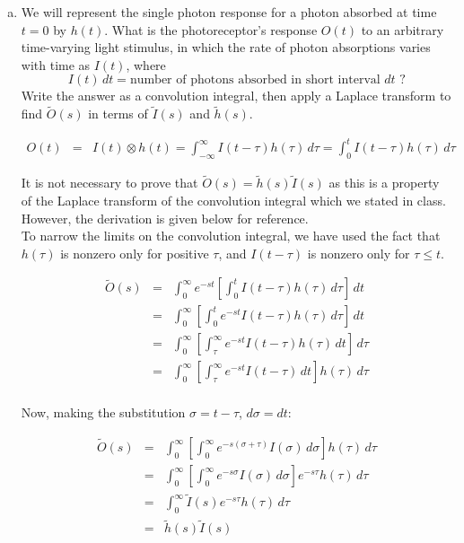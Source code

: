 \documentclass{article}
\begin{document}
\begin{enumerate}[a)]
\setlength{\itemsep}{0pt}
\item  We will represent the single photon response for a photon absorbed at time $t=0$ by $h(t)$. What is the photoreceptor's response $O(t)$ to an arbitrary time-varying light stimulus, in which the rate of photon absorptions varies with time as $I(t)$, where
\[ I(t) \, dt = \textrm{number of photons absorbed in short interval } dt \textrm{ ?} \]
Write the answer as a convolution integral, then apply a Laplace transform to find $\tilde{O}(s)$ in terms of $\tilde{I}(s)$ and $\tilde{h}(s)$.

{\color{red}
\begin{eqnarray*}
O(t) & = & I(t) \otimes h(t) = \int_{-\infty}^{\infty} I(t - \tau) h(\tau) \, d\tau = \int_{0}^{t} I(t - \tau) h(\tau) \, d\tau 
 \end{eqnarray*}
 
 It is not necessary to prove that $\tilde{O}(s) = \tilde{h}(s)  \tilde{I}(s)$ as this is a property of the Laplace transform of the convolution integral which we stated in class. However, the derivation is given below for reference.\\
 
 To narrow the limits on the convolution integral, we have used the fact that $h(\tau)$ is nonzero only for positive $\tau$, and $I(t-\tau)$ is nonzero only for $\tau \leq t$.

\begin{eqnarray*}
 \tilde{O}(s) & = & \int_{0}^{\infty} e^{-st} \left[  \int_{0}^{t} I(t - \tau) h(\tau) \, d\tau \right] \, dt\\ 
 & = & \int_{0}^{\infty} \left[  \int_{0}^{t} e^{-st} I(t - \tau) h(\tau) \, d\tau \right] \, dt\\ 
  & = & \int_{0}^{\infty} \left[  \int_{\tau}^{\infty} e^{-st} I(t - \tau) h(\tau) \, dt \right] \, d\tau\\ 
    & = & \int_{0}^{\infty} \left[  \int_{\tau}^{\infty} e^{-st} I(t - \tau) \, dt \right] h(\tau)  \, d\tau\\ 
     \end{eqnarray*}
     
Now, making the substitution $\sigma = t - \tau$, $d\sigma = dt$:
    
\begin{eqnarray*}
 \tilde{O}(s) & = & \int_{0}^{\infty} \left[  \int_{0}^{\infty} e^{-s(\sigma + \tau)} I(\sigma) \, d\sigma \right] h(\tau)  \, d\tau\\ 
 & = & \int_{0}^{\infty} \left[  \int_{0}^{\infty} e^{-s\sigma} I(\sigma) \, d\sigma \right] e^{-s\tau} h(\tau)  \, d\tau\\
  & = & \int_{0}^{\infty} \tilde{I}(s) e^{-s\tau} h(\tau)  \, d\tau\\  
 &= & \tilde{h}(s)  \tilde{I}(s)
 \end{eqnarray*}
}




\end{enumerate}
\end{document}
